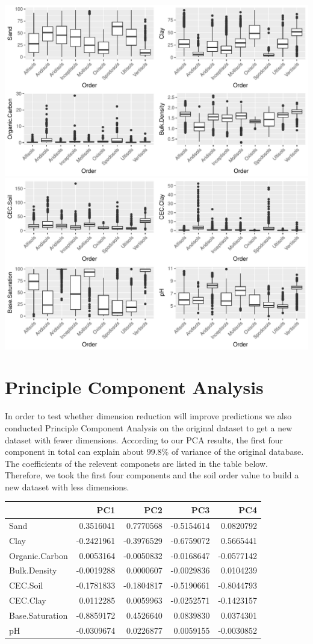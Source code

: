 \documentclass[]{article}
\begin{document}
\includegraphics{Project1_files/figure-latex/EDA - Mer-1.pdf}
\includegraphics{Project1_files/figure-latex/EDA - Mer-2.pdf}

\section{Principle Component
Analysis}\label{principle-component-analysis}

In order to test whether dimension reduction will improve predictions we
also conducted Principle Component Analysis on the original dataset to
get a new dataset with fewer dimensions. According to our PCA results,
the first four component in total can explain about 99.8\% of variance
of the original database. The coefficients of the relevent componets are
listed in the table below. Therefore, we took the first four components
and the soil order value to build a new dataset with less dimensions.

\begin{longtable}[]{@{}lrrrr@{}}
\toprule
& PC1 & PC2 & PC3 & PC4\tabularnewline
\midrule
\endhead
Sand & 0.3516041 & 0.7770568 & -0.5154614 & 0.0820792\tabularnewline
Clay & -0.2421961 & -0.3976529 & -0.6759072 & 0.5665441\tabularnewline
Organic.Carbon & 0.0053164 & -0.0050832 & -0.0168647 &
-0.0577142\tabularnewline
Bulk.Density & -0.0019288 & 0.0000607 & -0.0029836 &
0.0104239\tabularnewline
CEC.Soil & -0.1781833 & -0.1804817 & -0.5190661 &
-0.8044793\tabularnewline
CEC.Clay & 0.0112285 & 0.0059963 & -0.0252571 &
-0.1423157\tabularnewline
Base.Saturation & -0.8859172 & 0.4526640 & 0.0839830 &
0.0374301\tabularnewline
pH & -0.0309674 & 0.0226877 & 0.0059155 & -0.0030852\tabularnewline
\bottomrule
\end{longtable}
\end{document}
